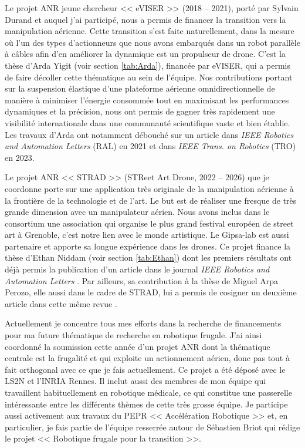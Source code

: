 \documentclass[a4paper,12pt]{article}
\begin{document}
Le projet ANR jeune chercheur << eVISER >> (2018 -- 2021), porté par Sylvain Durand et auquel j'ai participé, nous a permis de financer la transition vers la manipulation aérienne. Cette transition s'est faite naturellement, dans la mesure où l'un des types d'actionneurs que nous avons embarqués dans un robot parallèle à câbles afin d'en améliorer la dynamique est un propulseur de drone. C'est la thèse d'Arda Yigit (voir section \ref{tab:Arda}), financée par eVISER, qui a permis de faire décoller cette thématique au sein de l'équipe. Nos contributions portant sur la suspension élastique d'une plateforme aérienne omnidirectionnelle de manière à minimiser l'énergie consommée tout en maximisant les performances dynamiques et la précision, nous ont permis de gagner très rapidement une visibilité internationale dans une communauté scientifique vaste et bien établie. Les travaux d'Arda ont notamment débouché sur un article dans \textit{IEEE Robotics and Automation Letters} (RAL) \cite{2-YACD21} en 2021 et dans \textit{IEEE Trans. on Robotics} (TRO) \cite{2-YCAD23} en 2023.

Le projet ANR << STRAD >> (STReet Art Drone, 2022 -- 2026) que je coordonne porte sur une application très originale de la manipulation aérienne à la frontière de la technologie et de l'art. Le but est de réaliser une fresque de très grande dimension avec un manipulateur aérien. Nous avons inclus dans le consortium une association qui organise le plus grand festival européen de street art à Grenoble, c'est notre lien avec le monde artistique. Le Gipsa-lab est aussi partenaire et apporte sa longue expérience dans les drones. Ce projet finance la thèse d'Ethan Niddam (voir section \ref{tab:Ethan}) dont les premiers résultats ont déjà permis la publication d'un article dans le journal \textit{IEEE Robotics and Automation Letters} \cite{2-NDCD24}. Par ailleurs, sa contribution à la thèse de Miguel Arpa Perozo, elle aussi dans le cadre de STRAD, lui a permis de cosigner un deuxième article dans cette même revue \cite{2-ANCDxx}.

Actuellement je concentre tous mes efforts dans la recherche de financements pour ma future thématique de recherche en robotique frugale. J'ai ainsi coordonné la soumission cette année d'un projet ANR dont la thématique centrale est la frugalité et qui exploite un actionnement aérien, donc pas tout à fait orthogonal avec ce que je fais actuellement. Ce projet a été déposé avec le LS2N et l'INRIA Rennes. Il inclut aussi des membres de mon équipe qui travaillent habituellement en robotique médicale, ce qui constitue une passerelle intéressante entre les différents thèmes de cette très grosse équipe. Je participe aussi activement aux travaux du PEPR << Accélération Robotique >> et, en particulier, je fais partie de l'équipe resserrée autour de Sébastien Briot qui rédige le projet << Robotique frugale pour la transition >>.
\end{document}

